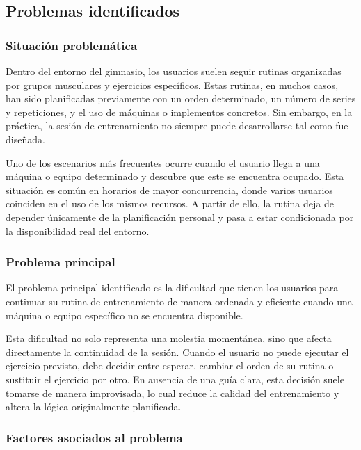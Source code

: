 \subsection{Problemas identificados}

\subsubsection{Situación problemática}

Dentro del entorno del gimnasio, los usuarios suelen seguir rutinas organizadas por grupos musculares y ejercicios específicos. Estas rutinas, en muchos casos, han sido planificadas previamente con un orden determinado, un número de series y repeticiones, y el uso de máquinas o implementos concretos. Sin embargo, en la práctica, la sesión de entrenamiento no siempre puede desarrollarse tal como fue diseñada.

Uno de los escenarios más frecuentes ocurre cuando el usuario llega a una máquina o equipo determinado y descubre que este se encuentra ocupado. Esta situación es común en horarios de mayor concurrencia, donde varios usuarios coinciden en el uso de los mismos recursos. A partir de ello, la rutina deja de depender únicamente de la planificación personal y pasa a estar condicionada por la disponibilidad real del entorno.

\subsubsection{Problema principal}

El problema principal identificado es la dificultad que tienen los usuarios para continuar su rutina de entrenamiento de manera ordenada y eficiente cuando una máquina o equipo específico no se encuentra disponible.

Esta dificultad no solo representa una molestia momentánea, sino que afecta directamente la continuidad de la sesión. Cuando el usuario no puede ejecutar el ejercicio previsto, debe decidir entre esperar, cambiar el orden de su rutina o sustituir el ejercicio por otro. En ausencia de una guía clara, esta decisión suele tomarse de manera improvisada, lo cual reduce la calidad del entrenamiento y altera la lógica originalmente planificada.

\subsubsection{Factores asociados al problema}

